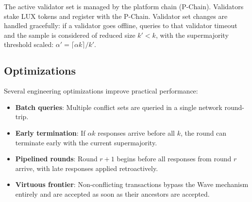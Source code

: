 The active validator set is managed by the platform chain (P-Chain). Validators stake LUX
tokens and register with the P-Chain. Validator set changes are handled gracefully: if a
validator goes offline, queries to that validator timeout and the sample is considered of
reduced size $k' < k$, with the supermajority threshold scaled: $\alpha' = \lceil \alpha k \rceil / k'$.

\subsection{Optimizations}

Several engineering optimizations improve practical performance:
\begin{itemize}[nosep]
\item \textbf{Batch queries}: Multiple conflict sets are queried in a single network round-trip.
\item \textbf{Early termination}: If $\alpha k$ responses arrive before all $k$, the round
can terminate early with the current supermajority.
\item \textbf{Pipelined rounds}: Round $r+1$ begins before all responses from round $r$
arrive, with late responses applied retroactively.
\item \textbf{Virtuous frontier}: Non-conflicting transactions bypass the Wave mechanism
entirely and are accepted as soon as their ancestors are accepted.
\end{itemize}

